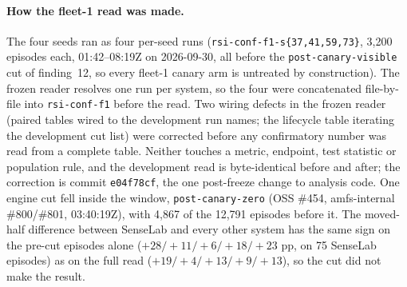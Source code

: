 \documentclass[11pt]{article}
\newcommand{\code}[1]{\texttt{#1}}
\begin{document}
\paragraph{How the fleet-1 read was made.} The four seeds ran as four per-seed runs
(\code{rsi-conf-f1-s\{37,41,59,73\}}, 3,200 episodes each, 01:42--08:19Z on 2026-09-30, all
before the \code{post-canary-visible} cut of finding~12, so every fleet-1 canary arm is untreated
by construction). The frozen reader resolves one run per system, so the four were concatenated
file-by-file into \code{rsi-conf-f1} before the read. Two wiring defects in the frozen reader
(paired tables wired to the development run names; the lifecycle table iterating the development
cut list) were corrected before any confirmatory number was read from a complete table. Neither
touches a metric, endpoint, test statistic or population rule, and the development read is
byte-identical before and after; the correction is commit \code{e04f78cf}, the one post-freeze
change to analysis code. One engine cut fell inside the window, \code{post-canary-zero} (OSS
\#454, amfs-internal \#800/\#801, 03:40:19Z), with 4,867 of the 12,791 episodes before it. The
moved-half difference between SenseLab and every other system has the same sign on the pre-cut
episodes alone ($+28/{+}11/{+}6/{+}18/{+}23$ pp, on 75 SenseLab episodes) as on the full read
($+19/{+}4/{+}13/{+}9/{+}13$), so the cut did not make the result.
\end{document}
